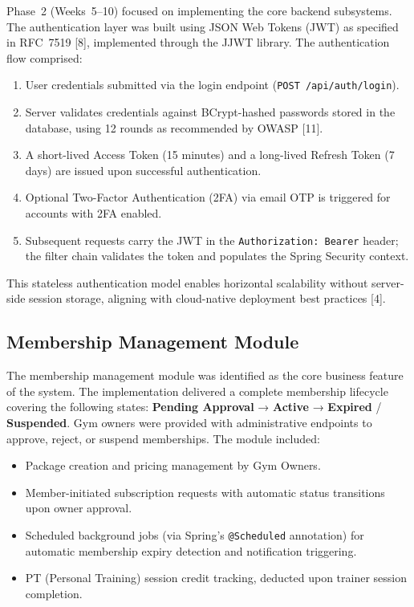 \documentclass[
  12pt,
  a4paperpaper,
]{report}
\providecommand{\tightlist}{%
  \setlength{\itemsep}{0pt}\setlength{\parskip}{0pt}}
\begin{document}
Phase~2 (Weeks~5--10) focused on implementing the core backend
subsystems. The authentication layer was built using JSON Web Tokens
(JWT) as specified in RFC~7519 {[}8{]}, implemented
through the JJWT library. The authentication flow comprised:

\begin{enumerate}
\def\labelenumi{\arabic{enumi}.}
\item User credentials submitted via the login endpoint
  (\texttt{POST /api/auth/login}).
\item Server validates credentials against BCrypt-hashed passwords
  stored in the database, using 12 rounds as recommended by OWASP
  {[}11{]}.
\item A short-lived Access Token (15 minutes) and a long-lived
  Refresh Token (7 days) are issued upon successful authentication.
\item Optional Two-Factor Authentication (2FA) via email OTP is
  triggered for accounts with 2FA enabled.
\item Subsequent requests carry the JWT in the
  \texttt{Authorization: Bearer} header; the filter chain validates
  the token and populates the Spring Security context.
\end{enumerate}

This stateless authentication model enables horizontal scalability
without server-side session storage, aligning with cloud-native
deployment best practices {[}4{]}.

\subsection{Membership Management
Module}\label{membership-management-module}

The membership management module was identified as the core business
feature of the system. The implementation delivered a complete
membership lifecycle covering the following states: \textbf{Pending
Approval} → \textbf{Active} → \textbf{Expired} / \textbf{Suspended}.
Gym owners were provided with administrative endpoints to approve,
reject, or suspend memberships. The module included:

\begin{itemize}
\tightlist
\item Package creation and pricing management by Gym Owners.
\item Member-initiated subscription requests with automatic status
  transitions upon owner approval.
\item Scheduled background jobs (via Spring's
  \texttt{@Scheduled} annotation) for automatic membership expiry
  detection and notification triggering.
\item PT (Personal Training) session credit tracking, deducted upon
  trainer session completion.
\end{itemize}
\end{document}
